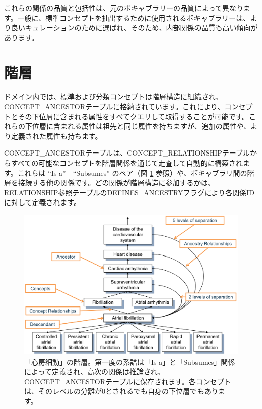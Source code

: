 \documentclass[
  11pt]{book}
\theoremstyle{definition}
\theoremstyle{definition}
\theoremstyle{definition}
\theoremstyle{definition}
\theoremstyle{remark}
\begin{document}
これらの関係の品質と包括性は、元のボキャブラリーの品質によって異なります。一般に、標準コンセプトを抽出するために使用されるボキャブラリーは、より良いキュレーションのために選ばれ、そのため、内部関係の品質も高い傾向があります。

\section{階層}\label{conceptAncestor}

ドメイン内では、標準および分類コンセプトは階層構造に組織され、CONCEPT\_ANCESTORテーブルに格納されています。これにより、コンセプトとその下位層に含まれる属性をすべてクエリして取得することが可能です。これらの下位層に含まれる属性は祖先と同じ属性を持ちますが、追加の属性や、より定義された属性も持ちます。

CONCEPT\_ANCESTORテーブルは、CONCEPT\_RELATIONSHIPテーブルからすべての可能なコンセプトを階層関係を通じて走査して自動的に構築されます。これらは ``Is a'' - ``Subsumes'' のペア（図 \ref{fig:conceptAncestor} 参照）や、ボキャブラリ間の階層を接続する他の関係です。どの関係が階層構造に参加するかは、RELATIONSHIP参照テーブルのDEFINES\_ANCESTRYフラグにより各関係IDに対して定義されます。



\begin{figure}

{\centering \includegraphics[width=1\linewidth]{images/StandardizedVocabularies/conceptAncestor} 

}

\caption{「心房細動」の階層。第一度の系譜は「Is a」と「Subsumes」関係によって定義され、高次の関係は推論され、CONCEPT\_ANCESTORテーブルに保存されます。各コンセプトは、そのレベルの分離が0とされるでも自身の下位層でもあります。 }\label{fig:conceptAncestor}
\end{figure}
\end{document}
